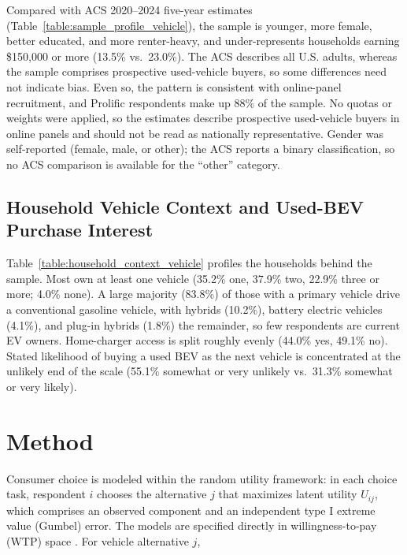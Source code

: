 \documentclass[a4paper,fleqn]{cas-sc}   %
\begin{document}
Compared with ACS 2020--2024 five-year estimates (Table~\ref{table:sample_profile_vehicle}), the sample is younger, more female, better educated, and more renter-heavy, and under-represents households earning \$150,000 or more (13.5\% vs.\ 23.0\%). The ACS describes all U.S. adults, whereas the sample comprises prospective used-vehicle buyers, so some differences need not indicate bias. Even so, the pattern is consistent with online-panel recruitment, and Prolific respondents make up 88\% of the sample. No quotas or weights were applied, so the estimates describe prospective used-vehicle buyers in online panels and should not be read as nationally representative. Gender was self-reported (female, male, or other); the ACS reports a binary classification, so no ACS comparison is available for the ``other'' category.



\subsection{Household Vehicle Context and Used-BEV Purchase Interest}
\label{subsec:household_context}

Table~\ref{table:household_context_vehicle} profiles the households behind the sample. Most own at least one vehicle (35.2\% one, 37.9\% two, 22.9\% three or more; 4.0\% none). A large majority (83.8\%) of those with a primary vehicle drive a conventional gasoline vehicle, with hybrids (10.2\%), battery electric vehicles (4.1\%), and plug-in hybrids (1.8\%) the remainder, so few respondents are current EV owners. Home-charger access is split roughly evenly (44.0\% yes, 49.1\% no). Stated likelihood of buying a used BEV as the next vehicle is concentrated at the unlikely end of the scale (55.1\% somewhat or very unlikely vs.\ 31.3\% somewhat or very likely).




\section{Method}
\label{section:method}

Consumer choice is modeled within the random utility framework: in each choice task, respondent $i$ chooses the alternative $j$ that maximizes latent utility $U_{ij}$, which comprises an observed component and an independent type I extreme value (Gumbel) error. The models are specified directly in willingness-to-pay (WTP) space \parencite{helvestonLogitrFastEstimation2023, trainWeeks2005}. For vehicle alternative $j$,
\end{document}
